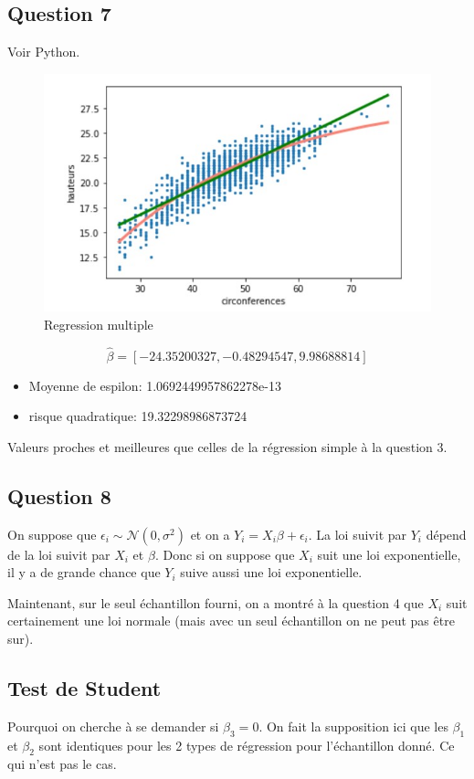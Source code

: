 \documentclass[]{book}
\theoremstyle{definition}
\begin{document}
\subsection*{Question 7}
Voir Python.

\begin{figure}
	\includegraphics[scale=1]{regression_multiple.jpg}
    \caption{Regression multiple}
    \label{fig:Regression multiple}
\end{figure}

$$\hat{\beta} = [-24.35200327,  -0.48294547,   9.98688814]$$
\begin{itemize}
    \item Moyenne de espilon: 1.0692449957862278e-13
    \item risque quadratique: 19.32298986873724
\end{itemize}
Valeurs proches et meilleures que celles de la r\'egression simple \`a la question 3.


\subsection*{Question 8}
On suppose que $\epsilon_i \sim \mathscr{N}(0,\sigma^2)$ et on a $Y_i = X_i\beta + \epsilon_i$. La loi suivit par $Y_i$ d\'epend de la loi suivit par $X_i$ et $\beta$. Donc si on suppose que $X_i$ suit une loi exponentielle, il y a de grande chance que $Y_i$ suive aussi une loi exponentielle.

Maintenant, sur le seul \'echantillon fourni, on a montr\'e \`a la question 4 que $X_i$ suit certainement une loi normale (mais avec un seul \'echantillon on ne peut pas \^etre sur).


\subsection*{Test de Student}
Pourquoi on cherche \`a se demander si $\beta_3 = 0$. On fait la supposition ici que les $\beta_1$ et $\beta_2$ sont identiques pour les 2 types de r\'egression pour l'\'echantillon donn\'e. Ce qui n'est pas le cas.
\end{document}
